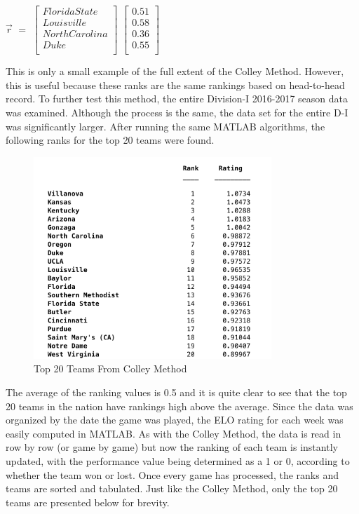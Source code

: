 \documentclass[12pt]{article}
\begin{document}
\begin{center}
$\vec{r}$ $=$
$\begin{bmatrix}
Florida State\\
Louisville\\
North Carolina\\
Duke\\
\end{bmatrix}$
$\begin{bmatrix}
0.51\\
0.58\\
0.36\\
0.55\\
\end{bmatrix}$
\end{center}
This is only a small example of the full extent of the Colley Method. However, this is useful because these ranks are the same rankings based on head-to-head record. To further test this method, the entire Division-I 2016-2017 season data was examined. Although the process is the same, the data set for the entire D-I was significantly larger. After running the same MATLAB algorithms, the following ranks for the top 20 teams were found.
\begin{figure}[H]
\centering
\includegraphics[width=0.8\textwidth]{Top20}
\caption{Top 20 Teams From Colley Method}
\label{fig:20Team}
\end{figure}
The average of the ranking values is 0.5 and it is quite clear to see that the top 20 teams in the nation have rankings high above the average.
\bigbreak
Since the data was organized by the date the game was played, the ELO rating for each week was easily computed in MATLAB. As with the Colley Method, the data is read in row by row (or game by game) but now the ranking of each team is instantly updated, with the performance value being determined as a 1 or 0, according to whether the team won or lost. Once every game has processed, the ranks and teams are sorted and tabulated. Just like the Colley Method, only the top 20 teams are presented below for brevity.
\end{document}
